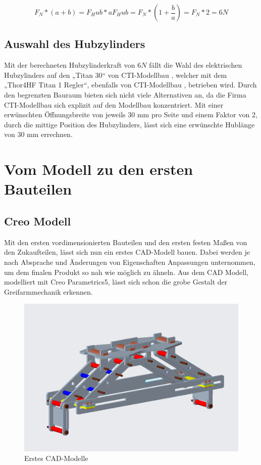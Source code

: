 \begin{equation}
F_N*(a + b) = F_Hub*a
F_Hub = F_N*(1 + \frac{b}{a}) = F_N*2 = 6N
\end{equation}

\subsection{Auswahl des Hubzylinders}
Mit der berechneten Hubzylinderkraft von $6N$ fällt die Wahl des elektrischen Hubzylinders auf den „Titan 30“ von CTI-Modellbau \cite{Titanzylinder}, welcher mit dem „Thor4HF Titan 1 Regler“, ebenfalls von CTI-Modellbau \cite{Titanregler}, betrieben wird. Durch den begrenzten Bauraum bieten sich nicht viele Alternativen an, da die Firma CTI-Modellbau sich explizit auf den Modellbau konzentriert.
Mit einer erwünschten Öffnungsbreite von jeweils 30 mm pro Seite und einem Faktor von 2, durch die mittige Position des Hubzylinders, lässt sich eine erwünschte Hublänge von 30 mm errechnen.

\section{Vom Modell zu den ersten Bauteilen}
\subsection{Creo Modell}
Mit den ersten vordimensionierten Bauteilen und den ersten festen Maßen von den Zukaufteilen, lässt sich nun ein erstes CAD-Modell bauen. Dabei werden je nach Absprache und Änderungen von Eigenschaften Anpassungen unternommen, um dem finalen Produkt so nah wie möglich zu ähneln. Aus dem CAD Modell, modelliert mit Creo Parametrics5, lässt sich schon die grobe Gestalt der Greifarmmechanik erkennen.

\begin{figure}
\begin{center}
\includegraphics[scale=0.5]{Grafiken/Creo1.png}
\caption{Erstes CAD-Modelle}
\label{creo1}
\end{center}
\end{figure}

